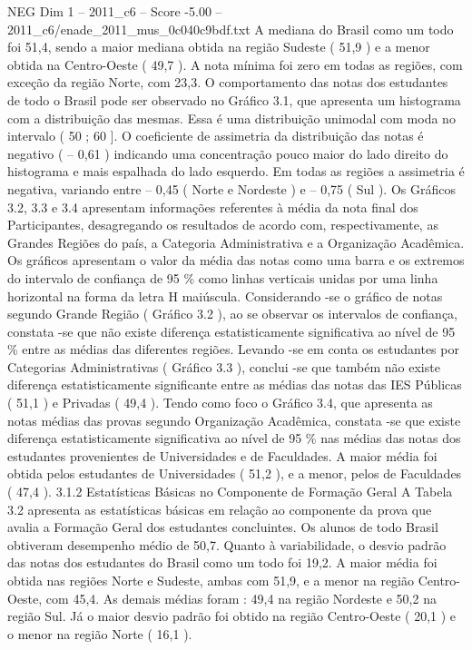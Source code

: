 \begin{textsample}{NEG Dim 1 – 2011\_c6 – Score -5.00 – 2011\_c6/enade\_2011\_mus\_0c040c9bdf.txt}
A mediana do Brasil como um todo foi 51,4, sendo a maior mediana obtida na região Sudeste ( 51,9 ) e a menor obtida na Centro-Oeste ( 49,7 ).
A nota mínima foi zero em todas as regiões, com exceção da região Norte, com 23,3.
O comportamento das notas dos estudantes de todo o Brasil pode ser observado no Gráfico 3.1, que apresenta um histograma com a distribuição das mesmas.
Essa é uma distribuição unimodal com moda no intervalo ( 50 ; 60 ].
O coeficiente de assimetria da distribuição das notas é negativo ( – 0,61 ) indicando uma concentração pouco maior do lado direito do histograma e mais espalhada do lado esquerdo.
Em todas as regiões a assimetria é negativa, variando entre – 0,45 ( Norte e Nordeste ) e – 0,75 ( Sul ).
Os Gráficos 3.2, 3.3 e 3.4 apresentam informações referentes à média da nota final dos Participantes, desagregando os resultados de acordo com, respectivamente, as Grandes Regiões do país, a Categoria Administrativa e a Organização Acadêmica.
Os gráficos apresentam o valor da média das notas como uma barra e os extremos do intervalo de confiança de 95 \% como linhas verticais unidas por uma linha horizontal na forma da letra H maiúscula.
Considerando -se o gráfico de notas segundo Grande Região ( Gráfico 3.2 ), ao se observar os intervalos de confiança, constata -se que não existe diferença estatisticamente significativa ao nível de 95 \% entre as médias das diferentes regiões.
Levando -se em conta os estudantes por Categorias Administrativas ( Gráfico 3.3 ), conclui -se que também não existe diferença estatisticamente significante entre as médias das notas das IES Públicas ( 51,1 ) e Privadas ( 49,4 ).
Tendo como foco o Gráfico 3.4, que apresenta as notas médias das provas segundo Organização Acadêmica, constata -se que existe diferença estatisticamente significativa ao nível de 95 \% nas médias das notas dos estudantes provenientes de Universidades e de Faculdades.
A maior média foi obtida pelos estudantes de Universidades ( 51,2 ), e a menor, pelos de Faculdades ( 47,4 ). 3.1.2 Estatísticas Básicas no Componente de Formação Geral A Tabela 3.2 apresenta as estatísticas básicas em relação ao componente da prova que avalia a Formação Geral dos estudantes concluintes.
Os alunos de todo Brasil obtiveram desempenho médio de 50,7.
Quanto à variabilidade, o desvio padrão das notas dos estudantes do Brasil como um todo foi 19,2.
A maior média foi obtida nas regiões Norte e Sudeste, ambas com 51,9, e a menor na região Centro-Oeste, com 45,4.
As demais médias foram : 49,4 na região Nordeste e 50,2 na região Sul.
Já o maior desvio padrão foi obtido na região Centro-Oeste ( 20,1 ) e o menor na região Norte ( 16,1 ).

\end{textsample}
